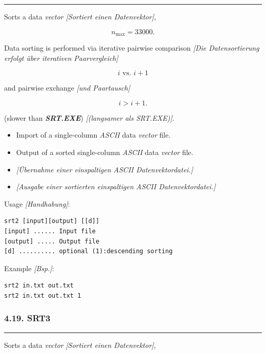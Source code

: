 \documentclass[
]{article}
\begin{document}
\begin{center}\rule{0.5\linewidth}{0.5pt}\end{center}

Sorts a data \emph{vector {[}Sortiert einen Datenvektor{]}},

\[n_{\max} = 33000.\]

Data sorting is performed via iterative pairwise comparison \emph{{[}Die
Datensortierung erfolgt über iterativen Paarvergleich{]}}

\[i\text{\ vs.\ }i + 1\]

and pairwise exchange \emph{{[}und Paartausch{]}}

\[i > i + 1.\]

(slower than \textbf{\emph{SRT.EXE}}) \emph{{[}(langsamer als
SRT.EXE){]}}.

\begin{itemize}
\item
  Import of a single-column \emph{ASCII} data \emph{vector} file.
\item
  Output of a sorted single-column \emph{ASCII} data \emph{vector} file.
\item
  \emph{{[}Übernahme einer einspaltigen ASCII Datenvektordatei.{]}}
\item
  \emph{{[}Ausgabe einer sortierten einspaltigen ASCII
  Datenvektordatei.{]}}
\end{itemize}

Usage \emph{{[}Handhabung{]}}:

\begin{verbatim}
srt2 [input][output] [[d]] 
[input] ...... Input file 
[output] ..... Output file
[d] .......... optional (1):descending sorting
\end{verbatim}

Example \emph{{[}Bsp.{]}}:

\begin{verbatim}
srt2 in.txt out.txt
srt2 in.txt out.txt 1
\end{verbatim}

\hypertarget{srt3}{%
\subsubsection{4.19. SRT3}\label{srt3}}

\begin{center}\rule{0.5\linewidth}{0.5pt}\end{center}

Sorts a data \emph{vector} \emph{{[}Sortiert einen Datenvektor{]}},
\end{document}
